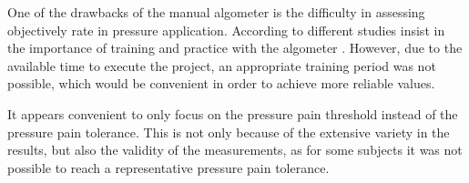 One of the drawbacks of the manual algometer is the difficulty in assessing objectively rate in pressure application. %
According to different studies insist in the importance of training and practice with the algometer \cite{Kinser2009}. However, due to the available time to execute the project, an appropriate training period was not possible, which would be convenient in order to achieve  more reliable values.




It appears convenient to only focus on the pressure pain threshold instead of the pressure pain tolerance. This is not only because of the extensive variety in the results, but also the validity of the measurements, as for some subjects it was not possible to reach a representative pressure pain tolerance.

